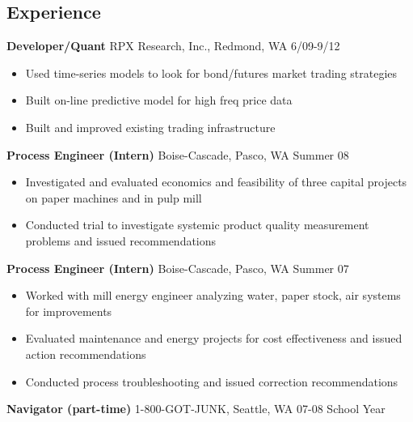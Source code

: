 \documentclass[margin]{res}
\begin{document}
 
 
\begin{resume} 
 

\section{Experience}
  {\bf Developer/Quant} RPX Research, Inc., Redmond, WA \hfill 6/09-9/12 
    \vspace{6pt}
   \begin{itemize} \itemsep -2pt  %
     \item Used time-series models to look for bond/futures market trading strategies 
     \item Built on-line predictive model for high freq price data 
     \item Built and improved existing trading infrastructure
   \end{itemize}

  {\bf Process Engineer (Intern)} Boise-Cascade, Pasco, WA \hfill  Summer 08
    \vspace{6pt}
  \begin{itemize} \itemsep -2pt %
    \item Investigated and evaluated economics and feasibility of three capital projects on paper machines and in pulp mill 
    \item Conducted trial to investigate systemic product quality measurement problems and issued recommendations 
  \end{itemize}

  {\bf Process Engineer (Intern)} Boise-Cascade, Pasco, WA \hfill  Summer 07
    \vspace{6pt}
  \begin{itemize} \itemsep -2pt
    \item Worked with mill energy engineer analyzing water, paper stock, air systems for improvements 
    \item Evaluated maintenance and energy projects for cost effectiveness and issued action recommendations 
    \item Conducted process troubleshooting and issued correction recommendations
   \end{itemize}

  {\bf Navigator (part-time)} 1-800-GOT-JUNK, Seattle, WA \hfill  07-08 School Year


\end{resume}
\end{document}
